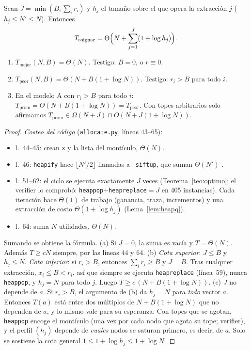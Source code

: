 \begin{proposicion}\label{prop:casos-reparto}
Sean $J=\min(B,\sum_ir_i)$ y $h_j$ el tamaño sobre el que opera la extracción $j$ ($h_j\le N'\le N$). Entonces
\[
T_{\text{asignar}}=\Theta\Bigl(N+\sum_{j=1}^{J}(1+\log h_j)\Bigr).
\]
\begin{enumerate}[label=(\alph*),nosep]
\item $T_{\text{mejor}}(N,B)=\Theta(N)$. Testigo: $B=0$, o $r\equiv0$.
\item $T_{\text{peor}}(N,B)=\Theta(N+B(1+\log N))$. Testigo: $r_i>B$ para todo $i$.
\item En el modelo A con $r_i>B$ para todo $i$: $T_{\text{prom}}=\Theta(N+B(1+\log N))=T_{\text{peor}}$. Con topes arbitrarios solo afirmamos $T_{\text{prom}}\in\Omega(N+J)\cap O(N+J(1+\log N))$.
\end{enumerate}
\end{proposicion}
\begin{proof}
\emph{Costeo del código} (\texttt{allocate.py}, líneas 43–65):
\begin{itemize}[nosep]
\item l.~44–45: crean \texttt{x} y la lista del montículo, $\Theta(N)$.
\item l.~46: \texttt{heapify} hace $\lfloor N'/2\rfloor$ llamadas a \texttt{\_siftup}, que suman $\Theta(N')$ \cite[cap.~6]{clrs}.
\item l.~51–62: el ciclo se ejecuta exactamente $J$ veces (Teorema~\ref{teo:optimo}; el verifier lo comprobó: \texttt{heappop}$+$\texttt{heapreplace}$=J$ en 405 instancias). Cada iteración hace $\Theta(1)$ de trabajo (ganancia, traza, incrementos) y una extracción de costo $\Theta(1+\log h_j)$ (Lema~\ref{lem:heapq}).
\item l.~64: suma $N$ utilidades, $\Theta(N)$.
\end{itemize}
Sumando se obtiene la fórmula.
(a) Si $J=0$, la suma es vacía y $T=\Theta(N)$. Además $T\ge cN$ siempre, por las líneas 44 y 64.
(b) \emph{Cota superior}: $J\le B$ y $h_j\le N$. \emph{Cota inferior}: si $r_i>B$, entonces $\sum_ir_i\ge B$ y $J=B$. Tras cualquier extracción, $x_i\le B<r_i$, así que siempre se ejecuta \texttt{heapreplace} (línea~59), nunca \texttt{heappop}, y $h_j=N$ para todo $j$. Luego $T\ge c\,(N+B(1+\log N))$.
(c) $J$ no depende de $a$. Si $r_i>B$, el argumento de (b) da $h_j=N$ para \emph{todo} vector $a$. Entonces $T(a)$ está entre dos múltiplos de $N+B(1+\log N)$ que no dependen de $a$, y lo mismo vale para su esperanza. Con topes que se agotan, \texttt{heappop} encoge el montículo (una vez por cada nodo que agota su tope; verifier), y el perfil $(h_j)$ depende de \emph{cuáles} nodos se saturan primero, es decir, de $a$. Solo se sostiene la cota general $1\le 1+\log h_j\le 1+\log N$.
\end{proof}

